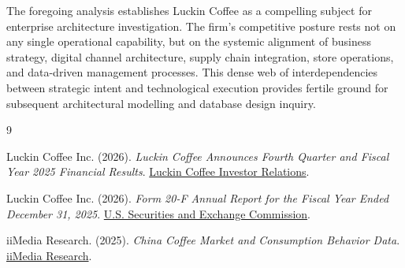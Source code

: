 \documentclass[12pt,a4paper]{article}
\begin{document}
\vspace{0.5cm}
\noindent
The foregoing analysis establishes Luckin Coffee as a compelling subject for enterprise architecture investigation. The firm's competitive posture rests not on any single operational capability, but on the systemic alignment of business strategy, digital channel architecture, supply chain integration, store operations, and data-driven management processes. This dense web of interdependencies between strategic intent and technological execution provides fertile ground for subsequent architectural modelling and database design inquiry.

\begingroup
\small
\setlength{\itemsep}{0pt}
\begin{thebibliography}{9}

Luckin Coffee Inc. (2026).
\emph{Luckin Coffee Announces Fourth Quarter and Fiscal Year 2025 Financial Results}.
\href{https://investor.luckincoffee.com/news-releases/news-release-details/luckin-coffee-announces-fourth-quarter-and-fiscal-year-2025/}{Luckin Coffee Investor Relations}.

Luckin Coffee Inc. (2026).
\emph{Form 20-F Annual Report for the Fiscal Year Ended December 31, 2025}.
\href{https://www.sec.gov/Archives/edgar/data/1767582/000110465926035712/lk-20251231x20f.htm}{U.S. Securities and Exchange Commission}.

iiMedia Research. (2025).
\emph{China Coffee Market and Consumption Behavior Data}.
\href{https://www.iimedia.cn/c400/106703.html}{iiMedia Research}.

\end{thebibliography}
\endgroup
\end{document}
